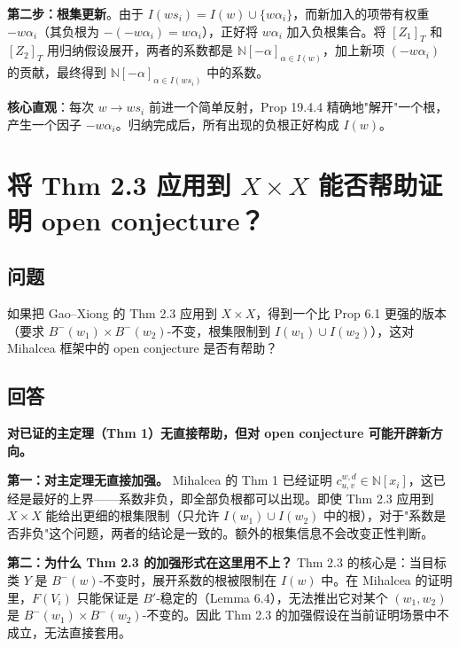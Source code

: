 \textbf{第二步：根集更新}。由于 $I(ws_i) = I(w) \cup \{w\alpha_i\}$，而新加入的项带有权重 $-w\alpha_i$（其负根为 $-( -w\alpha_i) = w\alpha_i$），正好将 $w\alpha_i$ 加入负根集合。将 $[Z_1]_T$ 和 $[Z_2]_T$ 用归纳假设展开，两者的系数都是 $\mathbb{N}[-\alpha]_{\alpha \in I(w)}$，加上新项 $(-w\alpha_i)$ 的贡献，最终得到 $\mathbb{N}[-\alpha]_{\alpha \in I(ws_i)}$ 中的系数。

\textbf{核心直观}：每次 $w \to ws_i$ 前进一个简单反射，Prop 19.4.4 精确地"解开"一个根，产生一个因子 $-w\alpha_i$。归纳完成后，所有出现的负根正好构成 $I(w)$。

\section{将 Thm 2.3 应用到 $X \times X$ 能否帮助证明 open conjecture？}

\subsection{问题}
如果把 Gao--Xiong \cite{GX2025} 的 Thm 2.3 应用到 $X \times X$，得到一个比 Prop 6.1 更强的版本（要求 $B^-(w_1)\times B^-(w_2)$-不变，根集限制到 $I(w_1)\cup I(w_2)$），这对 Mihalcea 框架中的 open conjecture 是否有帮助？
\subsection{回答}
\textbf{对已证的主定理（Thm 1）无直接帮助，但对 open conjecture 可能开辟新方向。}

\textbf{第一：对主定理无直接加强。} Mihalcea 的 Thm 1 已经证明 $c_{u,v}^{w,d} \in \mathbb{N}[x_i]$，这已经是最好的上界——系数非负，即全部负根都可以出现。即使 Thm 2.3 应用到 $X \times X$ 能给出更细的根集限制（只允许 $I(w_1)\cup I(w_2)$ 中的根），对于"系数是否非负"这个问题，两者的结论是一致的。额外的根集信息不会改变正性判断。

\textbf{第二：为什么 Thm 2.3 的加强形式在这里用不上？} Thm 2.3 的核心是：当目标类 $Y$ 是 $B^-(w)$-不变时，展开系数的根被限制在 $I(w)$ 中。在 Mihalcea 的证明里，$F(V_i)$ 只能保证是 $B'$-稳定的（Lemma 6.4），无法推出它对某个 $(w_1,w_2)$ 是 $B^-(w_1)\times B^-(w_2)$-不变的。因此 Thm 2.3 的加强假设在当前证明场景中不成立，无法直接套用。

